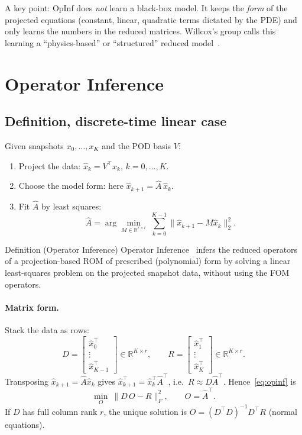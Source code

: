 \documentclass[11pt]{article}
\theoremstyle{remark}\newtheorem{remark}{Remark}
\newcommand{\R}{\mathbb{R}}
\newcommand{\xh}{\hat{x}}
\newcommand{\Ah}{\hat{A}}
\begin{document}
A key point: OpInf does \emph{not} learn a black-box model. It keeps the \emph{form} of the projected equations (constant, linear, quadratic terms dictated by the PDE) and only learns the numbers in the reduced matrices. Willcox's group calls this learning a ``physics-based'' or ``structured'' reduced model~\cite{KPW24}.

\section{Operator Inference}\label{sec:opinf}
\subsection{Definition, discrete-time linear case}
Given snapshots $x_0,\dots,x_K$ and the POD basis $V$:
\begin{enumerate}[leftmargin=1.5em]
\item Project the data: $\xh_k=V^\top x_k$, $k=0,\dots,K$.
\item Choose the model form: here $\xh_{k+1}=\Ah\,\xh_k$.
\item Fit $\Ah$ by least squares:
\begin{equation}\label{eq:opinf}
\Ah=\arg\min_{M\in\R^{r\times r}}\ \sum_{k=0}^{K-1}\|\xh_{k+1}-M\xh_k\|_2^2 .
\end{equation}
\end{enumerate}

\begin{defbox}{Definition (Operator Inference)}
Operator Inference~\cite{PW16} infers the reduced operators of a projection-based ROM of prescribed (polynomial) form by solving a linear least-squares problem on the projected snapshot data, without using the FOM operators.
\end{defbox}

\paragraph{Matrix form.} Stack the data as rows:
\[
D=\begin{bmatrix}\xh_0^\top\\ \vdots\\ \xh_{K-1}^\top\end{bmatrix}\in\R^{K\times r},\qquad
R=\begin{bmatrix}\xh_1^\top\\ \vdots\\ \xh_{K}^\top\end{bmatrix}\in\R^{K\times r}.
\]
Transposing $\xh_{k+1}=\Ah\xh_k$ gives $\xh_{k+1}^\top=\xh_k^\top\Ah^\top$, i.e.\ $R\approx D\Ah^\top$. Hence~\eqref{eq:opinf} is
\begin{equation}\label{eq:lsq}
\min_{O}\ \|D\,O-R\|_F^2,\qquad O=\Ah^\top .
\end{equation}
If $D$ has full column rank $r$, the unique solution is $O=(D^\top D)^{-1}D^\top R$ (normal equations).
\end{document}
